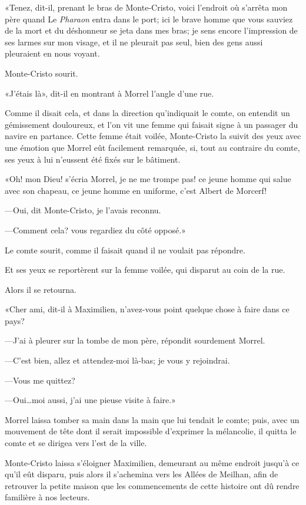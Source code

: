 «Tenez, dit-il, prenant le bras de Monte-Cristo, voici l'endroit où s'arrêta mon père quand Le \textit{Pharaon} entra dans le port; ici le brave homme que vous sauviez de la mort et du déshonneur se jeta dans mes bras; je sens encore l'impression de ses larmes sur mon visage, et il ne pleurait pas seul, bien des gens aussi pleuraient en nous voyant. 

Monte-Cristo sourit. 

«J'étais là», dit-il en montrant à Morrel l'angle d'une rue. 

Comme il disait cela, et dans la direction qu'indiquait le comte, on entendit un gémissement douloureux, et l'on vit une femme qui faisait signe à un passager du navire en partance. Cette femme était voilée, Monte-Cristo la suivit des yeux avec une émotion que Morrel eût facilement remarquée, si, tout au contraire du comte, ses yeux à lui n'eussent été fixés sur le bâtiment. 

«Oh! mon Dieu! s'écria Morrel, je ne me trompe pas! ce jeune homme qui salue avec son chapeau, ce jeune homme en uniforme, c'est Albert de Morcerf! 

—Oui, dit Monte-Cristo, je l'avais reconnu. 

—Comment cela? vous regardiez du côté opposé.» 

Le comte sourit, comme il faisait quand il ne voulait pas répondre. 

Et ses yeux se reportèrent sur la femme voilée, qui disparut au coin de la rue. 

Alors il se retourna. 

«Cher ami, dit-il à Maximilien, n'avez-vous point quelque chose à faire dans ce pays? 

—J'ai à pleurer sur la tombe de mon père, répondit sourdement Morrel. 

—C'est bien, allez et attendez-moi là-bas; je vous y rejoindrai. 

—Vous me quittez? 

—Oui\dots moi aussi, j'ai une pieuse visite à faire.» 

Morrel laissa tomber sa main dans la main que lui tendait le comte; puis, avec un mouvement de tête dont il serait impossible d'exprimer la mélancolie, il quitta le comte et se dirigea vers l'est de la ville. 

Monte-Cristo laissa s'éloigner Maximilien, demeurant au même endroit jusqu'à ce qu'il eût disparu, puis alors il s'achemina vers les Allées de Meilhan, afin de retrouver la petite maison que les commencements de cette histoire ont dû rendre familière à nos lecteurs. 

